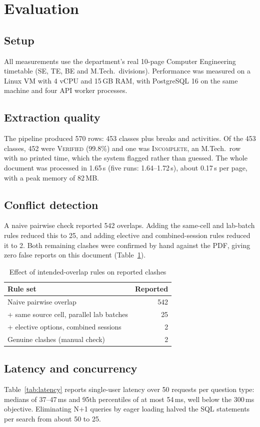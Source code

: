 \documentclass[conference]{IEEEtran}
\begin{document}
\section{Evaluation}
\subsection{Setup}
All measurements use the department's real 10-page Computer Engineering timetable (SE, TE, BE and
M.Tech.\ divisions). Performance was measured on a Linux VM with 4 vCPU and 15\,GB RAM, with PostgreSQL 16
on the same machine and four API worker processes.

\subsection{Extraction quality}
The pipeline produced 570 rows: 453 classes plus breaks and activities. Of the 453 classes, 452 were
\textsc{Verified} (99.8\%) and one was \textsc{Incomplete}, an M.Tech.\ row with no printed time, which the
system flagged rather than guessed. The whole document was processed in 1.65\,s (five runs: 1.64--1.72\,s),
about 0.17\,s per page, with a peak memory of 82\,MB.

\subsection{Conflict detection}
A naive pairwise check reported 542 overlaps. Adding the same-cell and lab-batch rules reduced this to 25,
and adding elective and combined-session rules reduced it to 2. Both remaining clashes were confirmed by
hand against the PDF, giving zero false reports on this document (Table~\ref{tab:clash}).

\begin{table}[t]
\centering
\caption{Effect of intended-overlap rules on reported clashes}
\label{tab:clash}
\begin{tabular}{@{}lr@{}}
\toprule
\textbf{Rule set} & \textbf{Reported}\\
\midrule
Naive pairwise overlap & 542\\
+ same source cell, parallel lab batches & 25\\
+ elective options, combined sessions & 2\\
\midrule
Genuine clashes (manual check) & 2\\
\bottomrule
\end{tabular}
\end{table}

\subsection{Latency and concurrency}
Table~\ref{tab:latency} reports single-user latency over 50 requests per question type: medians of
37--47\,ms and 95th percentiles of at most 54\,ms, well below the 300\,ms objective. Eliminating N+1 queries
by eager loading halved the SQL statements per search from about 50 to 25.
\end{document}
